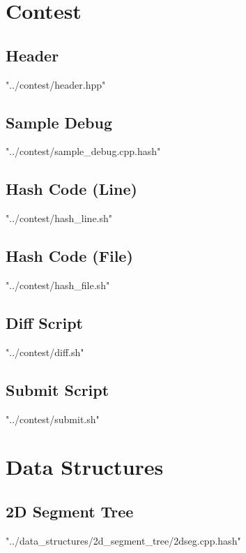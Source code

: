 \documentclass [5pt,twocolumn,oneside]{article}
\begin{document}
\begin{landscape}
\begin{multicols}{3}
\pagestyle{fancy}
\fancyfoot{}
\fancyhead[R]{\thepage}
\renewcommand{\headrulewidth}{0.4pt}
\tableofcontents
\scriptsize



\section{Contest}
\subsection{Header}
 {"../contest/header.hpp"}


\subsection{ Sample Debug}
 {"../contest/sample_debug.cpp.hash"}


\subsection{ Hash Code (Line)}
 {"../contest/hash_line.sh"}

\subsection{ Hash Code (File)}
 {"../contest/hash_file.sh"}

\subsection{ Diff Script}
 {"../contest/diff.sh"}

\subsection{ Submit Script}
 {"../contest/submit.sh"}


\section{Data Structures}
\subsection{ 2D Segment Tree}
 {"../data_structures/2d_segment_tree/2dseg.cpp.hash"}



\end{multicols}
\end{landscape}
\end{document}
